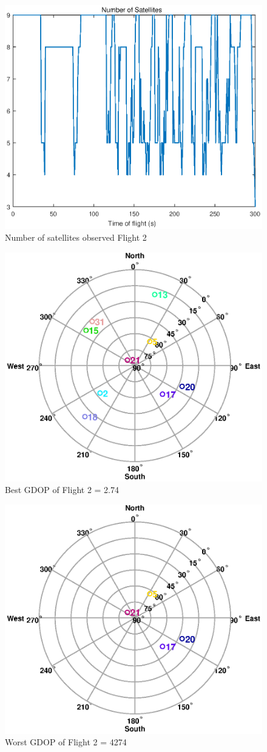 \documentclass[Space3_Assign2]{subfile}
\begin{document}
\begin{figure}
\centering
\includegraphics[width=0.8\linewidth]{1cnumsats.eps}
\caption{Number of satellites observed Flight 2}
\label{fig:1cnumsats}
\end{figure}
\begin{figure}
\centering
\includegraphics[width=0.7\linewidth]{1Cbest.eps}
\caption{Best GDOP of Flight 2 = 2.74}
\label{fig:1Cbest}
\end{figure}
\begin{figure}
\centering
\includegraphics[width=0.7\linewidth]{1Cwrost.eps}
\caption{Worst GDOP of Flight 2 = 4274}
\label{fig:1Cwrost}
\end{figure}
\end{document}
